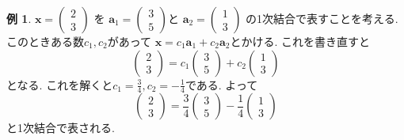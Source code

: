 \documentclass[dvipdfmx,a4paper,11pt]{article}
\theoremstyle{definition}
\newtheorem{exa}[thm]{例}
\begin{document}
 \begin{exa}
$\bm{x}=
   \begin{pmatrix}
2\\3
 \end{pmatrix}$
 を
 $\bm{a}_1 =   
  \begin{pmatrix}
3\\5
 \end{pmatrix}$と
  $\bm{a}_2=   
  \begin{pmatrix}
1\\3
 \end{pmatrix}$
 の1次結合で表すことを考える. 
 このときある数$c_1, c_2$があって
 $\bm{x}=c_1\bm{a}_1 + c_2\bm{a}_2$とかける.
 これを書き直すと
   $$
    \begin{pmatrix}
2\\3
 \end{pmatrix}
 =
 c_1  \begin{pmatrix}
3\\5
 \end{pmatrix}
 +
 c_2   \begin{pmatrix}
1\\3
 \end{pmatrix}
 $$
 となる. 
 これを解くと$c_1=\frac{3}{4}, c_2=-\frac{1}{4}$である.
 よって
 $$
    \begin{pmatrix}
2\\3
 \end{pmatrix}
 =
\frac{3}{4}  \begin{pmatrix}
3\\5
 \end{pmatrix}
-\frac{1}{4}
  \begin{pmatrix}
1\\3
 \end{pmatrix}
 $$
 と1次結合で表される.
 \end{exa}
\end{document}
